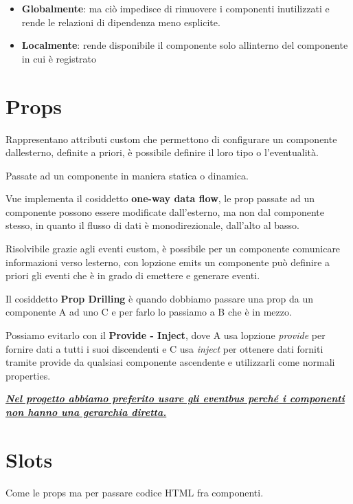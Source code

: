 \begin{itemize}
\item
  \textbf{Globalmente}: ma ciò impedisce di rimuovere i componenti
  inutilizzati e rende le relazioni di dipendenza meno esplicite.
\item
  \textbf{Localmente}: rende disponibile il componente solo
  all\textquotesingle interno del componente in cui è registrato
\end{itemize}

\section{Props}\label{props}

Rappresentano attributi custom che permettono di configurare un
componente dall\textquotesingle esterno, definite a priori, è possibile
definire il loro tipo o l'eventualità.

Passate ad un componente in maniera statica o dinamica.

Vue implementa il cosiddetto \textbf{one-way data flow}, le prop passate
ad un componente possono essere modificate dall'esterno, ma non dal
componente stesso, in quanto il flusso di dati è monodirezionale,
dall'alto al basso.

Risolvibile grazie agli eventi custom, è possibile per un componente
comunicare informazioni verso l\textquotesingle esterno, con
l\textquotesingle opzione emits un componente può definire a priori gli
eventi che è in grado di emettere e generare eventi.

Il cosiddetto \textbf{Prop Drilling} è quando dobbiamo passare una prop
da un componente A ad uno C e per farlo lo passiamo a B che è in mezzo.

Possiamo evitarlo con il \textbf{Provide - Inject}, dove A usa
l\textquotesingle opzione \emph{provide} per fornire dati a tutti i suoi
discendenti e C usa \emph{inject} per ottenere dati forniti tramite
provide da qualsiasi componente ascendente e utilizzarli come normali
properties.

\emph{\textbf{\ul{Nel progetto abbiamo preferito usare gli eventbus
perché i componenti non hanno una gerarchia diretta.}}}

\section{Slots}\label{slots}

Come le props ma per passare codice HTML fra componenti.

